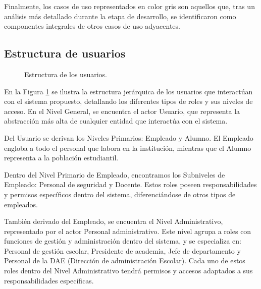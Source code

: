 Finalmente, los casos de uso representados en color gris son aquellos que, tras un análisis más detallado durante la etapa de desarrollo, se identificaron como componentes integrales de otros casos de uso adyacentes.


\subsection{Estructura de usuarios }

\begin{figure}[htbp!]
	\begin{center}
		\caption{Estructura de los usuarios.}
		\label{fig:EstructuraU}
	\end{center}
\end{figure} 

En la Figura \ref{fig:EstructuraU} se ilustra la estructura jerárquica de los usuarios que interactúan con el sistema propuesto, detallando los diferentes tipos de roles y sus niveles de acceso. En el Nivel General, se encuentra el actor Usuario, que representa la abstracción más alta de cualquier entidad que interactúa con el sistema.

Del Usuario se derivan los Niveles Primarios: Empleado y Alumno. El Empleado engloba a todo el personal que labora en la institución, mientras que el Alumno representa a la población estudiantil.

Dentro del Nivel Primario de Empleado, encontramos los Subniveles de Empleado: Personal de seguridad y Docente. Estos roles poseen responsabilidades y permisos específicos dentro del sistema, diferenciándose de otros tipos de empleados.

También derivado del Empleado, se encuentra el Nivel Administrativo, representado por el actor Personal administrativo. Este nivel agrupa a roles con funciones de gestión y administración dentro del sistema, y se especializa en: Personal de gestión escolar, Presidente de academia, Jefe de departamento y Personal de la DAE (Dirección de administración Escolar). Cada uno de estos roles dentro del Nivel Administrativo tendrá permisos y accesos adaptados a sus responsabilidades específicas.

